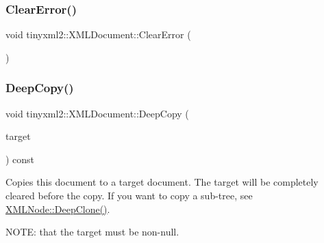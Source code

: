 \mbox{\label{classtinyxml2_1_1_x_m_l_document_a4085d9c52f1d93214311459d6d1fcf17}} 
\subsubsection{\texorpdfstring{Clear\+Error()}{ClearError()}}
{\footnotesize\ttfamily void tinyxml2\+::\+X\+M\+L\+Document\+::\+Clear\+Error (\begin{DoxyParamCaption}{ }\end{DoxyParamCaption})\hspace{0.3cm}{\ttfamily [inline]}}

\mbox{\label{classtinyxml2_1_1_x_m_l_document_af592ffc91514e25a39664521ac83db45}} 
\subsubsection{\texorpdfstring{Deep\+Copy()}{DeepCopy()}}
{\footnotesize\ttfamily void tinyxml2\+::\+X\+M\+L\+Document\+::\+Deep\+Copy (\begin{DoxyParamCaption}\item[{\mbox{\hyperlink{classtinyxml2_1_1_x_m_l_document}{X\+M\+L\+Document}} $\ast$}]{target }\end{DoxyParamCaption}) const}

Copies this document to a target document. The target will be completely cleared before the copy. If you want to copy a sub-\/tree, see \mbox{\hyperlink{classtinyxml2_1_1_x_m_l_node_a3bb369fd733f1989b751d99a9417adab}{X\+M\+L\+Node\+::\+Deep\+Clone()}}.

N\+O\+TE\+: that the \textquotesingle{}target\textquotesingle{} must be non-\/null. \mbox{\label{classtinyxml2_1_1_x_m_l_document_ac1d6e2c7fcc1a660624ac4f68e96380d}} 
